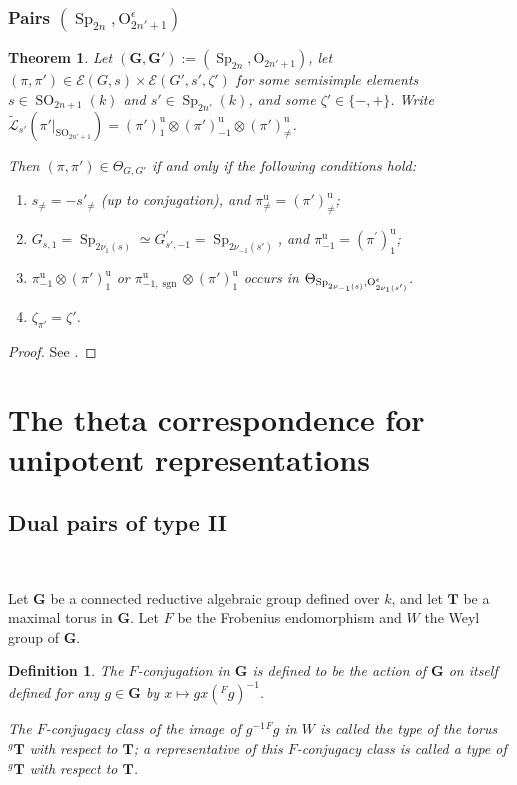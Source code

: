 \documentclass[12pt]{amsart}
\numberwithin{equation}{subsection}
\newtheorem{defn}[equation]{Definition}
\newtheorem{thm}[equation]{Theorem}
\newcommand{\cE}{\mathcal{E}}
\newcommand{\cL}{\mathcal{L}}
\newcommand{\tcL}{{\widetilde{\cL}}}
\newcommand{\sgn}{\operatorname{sgn}}
\newcommand{\bG}{\mathbf{G}}
\newcommand{\bT}{\mathbf{T}}
\newcommand{\unip}{\mathrm{u}}
\newcommand{\Sp}{\operatorname{Sp}}
\newcommand{\SO}{\operatorname{SO}}
\def\rO{{\mathrm{O}}}
\begin{document}
\subsubsection{Pairs $(\Sp_{2n},\rO_{2n'+1}^\epsilon)$}
\begin{thm}  \label{thm:reducSpOodd}
Let $(\bG,\bG'):=(\Sp_{2n},\rO_{2n'+1})$, let $(\pi,\pi')\in\cE(G,s)\times\cE(G',s',\zeta')$ for some semisimple elements $s\in \SO_{2n+1}(k)$ and $s'\in \Sp_{2n'}(k)$,  and some $\zeta'\in\{-,+\}$.
Write $\tcL_{s'}(\pi'|_{\SO_{2n'+1}})=(\pi')^\unip_1\otimes(\pi')^\unip_{-1}\otimes(\pi')^\unip_{\neq}$.

Then  $(\pi,\pi')\in\Theta_{G,G'}$ if and only if the following conditions hold:
\begin{enumerate}
\item $s_{\neq}=-s'_{\neq}$ (up to conjugation), and $\pi^\unip_{\neq}=(\pi')^\unip_{\neq}$;
\item $G_{s,1}=\Sp_{2\nu_1(s)}\simeq G^{\prime}_{s',-1}=\Sp_{2\nu_{-1}(s')}$, and $\pi^\unip_{-1}=(\pi^{\prime})^{\unip}_{1}$;
\item $\pi^\unip_{-1}\otimes(\pi')^\unip_{1}$ or $\pi^{\unip}_{-1,\sgn}\otimes(\pi')^\unip_{1}$ occurs in $\Theta_{\Sp_{\vphantom{s'}2\nu_{-1}(s)},\rO^\epsilon_{2\nu_{1}(s')}}$.
\item $\zeta_{\pi'}=\zeta'$.
\end{enumerate}
\end{thm}
\begin{proof}
See \cite[Theorem~7.6]{Pan-MathAnn}.
\end{proof}


\section{The theta correspondence for unipotent representations} \label{sec:unip}

\subsection{Dual pairs of type II}\

Let $\bG$ be a connected reductive algebraic group defined over $k$, and let $\bT$ be a maximal torus in $\bG$. Let $F$ be the Frobenius endomorphism and $W$ the Weyl group of $\bG$.

\begin{defn} {\rm
The  \textit{$F$-conjugation} in $\bG$ is defined to be the action of $\bG$ on itself defined for any $g\in \bG$ by $x\mapsto gx({}^Fg)^{-1}$.

The $F$-conjugacy class of the image of $g^{-1}{}^Fg$ in $W$ is called the \textit{type} of the torus ${}^g\bT$ with respect to $\bT$; a representative of this 
$F$-conjugacy class is called a type of ${}^g\bT$ with respect to $\bT$.}
\end{defn}
\end{document}
